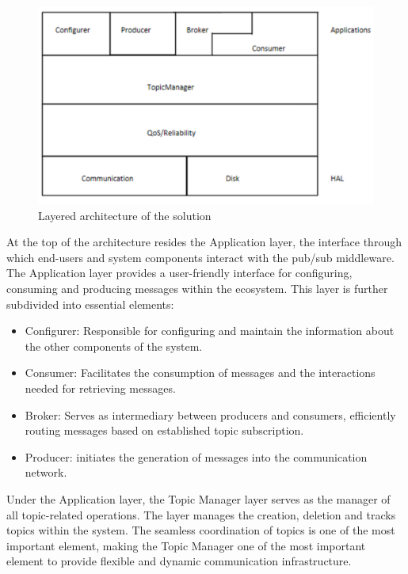 \begin{figure}[H]
    \centering
    \includegraphics[width=1.0\textwidth]{Figures/architecture_layers.png}
    \caption{Layered architecture of the solution}
\end{figure}

At the top of the architecture resides the Application layer, the interface
through which end-users and system components interact with the pub/sub
middleware. The Application layer provides a user-friendly interface for
configuring, consuming and producing messages within the ecosystem.
This layer is further subdivided into essential elements:

\begin{itemize}
    \item   Configurer: Responsible for configuring and maintain the
            information about the other components of the system.
    \item   Consumer: Facilitates the consumption of messages and the
            interactions needed for retrieving messages.
    \item   Broker: Serves as intermediary between producers and consumers,
            efficiently routing messages based on established topic
            subscription.
    \item   Producer: initiates the generation of messages into the
            communication network.
\end{itemize}

Under the Application layer, the Topic Manager layer serves as the manager of
all topic-related operations. The layer manages the creation, deletion and
tracks topics within the system. The seamless coordination of topics is one
of the most important element, making the Topic Manager one of the most
important element to provide flexible and dynamic communication infrastructure.


